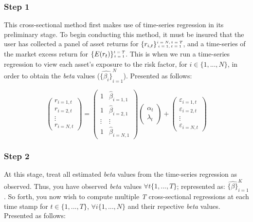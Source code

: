 \documentclass[11pt, english]{article}
\begin{document}
		\subsubsection*{Step 1}

	This cross-sectional method first makes use of time-series regression in its preliminary stage. To begin conducting this method, it must be insured that the user has collected a panel of asset returns for $\{r_{i,t}\}\tiny\begin{matrix}i=N,t=T\\i=1,t=1\end{matrix}$, and a time-series of the market excess return for $\{E(r_t)\}\tiny\begin{matrix}t=T\\t=1\end{matrix}$. This is when we run a time-series regression to view each asset's exposure to the risk factor, for $i\in\{1,...,N\}$, in order to obtain the \textit{beta} values ($\hat{\{\beta_i\}}_{i=1}^N$). Presented as follows: 

		$$
		\begin{pmatrix}
			r_{i=1,t}\\
			r_{i=2,t}\\
			\vdots\\
			r_{i=N,t}
		\end{pmatrix}=
		\begin{pmatrix}
			1 & \hat{\beta}_{i=1,1}\\
			1 & \hat{\beta}_{i=2,1}\\ 
			\vdots & \vdots \\
			1 & \hat{\beta}_{i=N,1}
                \end{pmatrix}
		\begin{pmatrix}
			\alpha_t\\
			\lambda_t
		\end{pmatrix}+
		\begin{pmatrix}
			\varepsilon_{i=1,t}\\
                        \varepsilon_{i=2,t}\\
                        \vdots\\
                        \varepsilon_{i=N,t}
		\end{pmatrix}
		$$

		\subsubsection*{Step 2}

	At this stage, treat all estimated \textit{beta} values from the time-series regression as observed. Thus, you have observed \textit{beta} values $\forall t\{1,...,T\}$; represented as: $\hat{\{\beta\}}_{i=1}^K$. So forth, you now wish to compute multiple \textit{T} cross-sectional regressions at each time stamp for $t\in\{1,...,T\}$, $\forall i\{1,...,N\}$ and their repective \textit{beta} values. Presented as follows:
\end{document}
